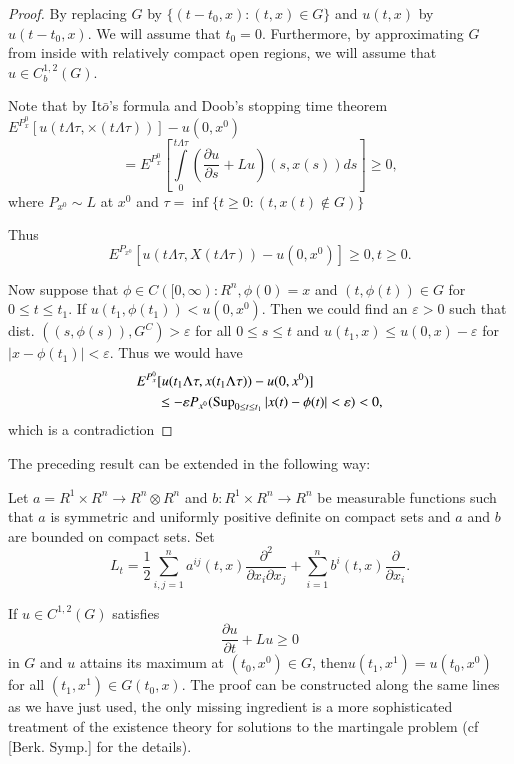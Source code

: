 \begin{proof}
By replacing $G$ by $\{(t-t_0, x):(t, x)\in G\}$ and $u(t, x)$ by
$u(t-t_0, x)$. We will assume that $t_0=0$. Furthermore, by
approximating $G$ from inside with relatively compact open regions,
we will assume that $u \in C_b^{1,2}(G)$. 

Note that by It$\bar{o}$'s formula and Doob's stopping time theorem\break
$E^{P_x^{0}}[u(t \Lambda \tau, \times(t \Lambda \tau))]-u(0, x^0)$ 
$$ 
=E^{P_x^0}[\int\limits_0^{t \Lambda \tau}(\frac{\partial u}{\partial 
    s}+Lu)(s,x(s))ds] \geq 0, 
$$
where $P_{x^0} \sim L$ at $x^0$ and $\tau=\inf \{t \geq 0: (t,
x(t)\notin G)\}$ 

Thus\pageoriginale
$$
E^{P_{x^0}}[u(t \Lambda \tau, X (t \Lambda \tau))-u(0, x^0)] \geq 0,t \geq 0.
$$

Now suppose that $\phi \in C([0, \infty): R^n, \phi(0)=x$ and $(t,
  \phi(t)) \in G$ for $0 \leq t \leq t_1$. If $u(t_1, \phi(t_1)) <
  u(0, x^0)$. Then we could find an $\varepsilon >0$ such that
  dist. $((s, \phi(s)), G^C)> \varepsilon $ for all $0 \leq s \leq t $
  and $u(t_1, x) \leq u(0, x)-\varepsilon $ for $|x-\phi(t_1)|<
  \varepsilon $. Thus we would have 
\begin{align*}
E^{P_x^0} & [u(t_1 \Lambda \tau, x (t_1 \Lambda \tau))-u(0, x^0)]\\
& \leq -\varepsilon P_{x^0}(\operatorname{Sup}_{0 \leq t \leq
  t_1}|x(t)-\phi(t)|<\varepsilon )<0, 
\end{align*}
which is a contradiction
\end{proof}

\setcounter{remark}{11}
\begin{remark}%
The preceding result can be extended in the following way:

Let $a=R^1 \times R^n \to R^n \otimes R^n$ and $b:R^1 \times R^n \to
R^n$ be measurable functions such that $a$ is symmetric and uniformly
positive definite on compact sets and $a$ and $b$ are bounded on
compact sets. Set 
$$
L_t= \frac{1}{2}\sum_{i, j=1}^n a^{ij}(t,x)\frac{\partial^2}{\partial
  x_i \partial x_j}+\sum_{i=1}^n b^i (t, x) \frac{\partial}{\partial
  x_i}. 
$$

If $u \in C^{1, 2}(G)$ satisfies
$$
\frac{\partial u}{\partial t}+ Lu \geq 0
$$
in $G$ and $u$ attains its maximum at $(t_0, x^0)\in G$,
then\pageoriginale $ u (t_1,x^1 )  = u ( t_0,x^0 ) $  for all $(t_1,x^1)
\in G ( t_0,x )$. The  proof can be constructed along the
same lines  as we have just used, the only missing  ingredient is a
more  sophisticated treatment of the  existence theory for solutions
to the  martingale problem  (cf [Berk. Symp.] for the details). 
\end{remark}

